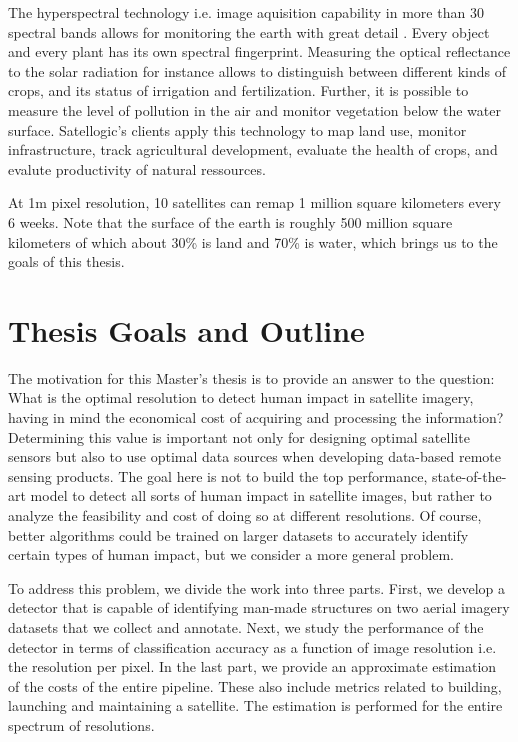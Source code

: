 The hyperspectral technology i.e. image aquisition capability in more than 30 spectral bands allows for monitoring the earth with great detail \parencite{satellogic2019}. Every object and every plant has its own spectral fingerprint. Measuring the optical reflectance to the solar radiation for instance allows to distinguish between different kinds of crops, and its status of irrigation and fertilization. Further, it is possible to measure the level of pollution in the air and monitor vegetation below the water surface. Satellogic's clients apply this technology to map land use, monitor infrastructure, track agricultural development, evaluate the health of crops, and evalute productivity of natural ressources.

At 1m pixel resolution, 10 satellites can remap 1 million square kilometers every 6 weeks. Note that the surface of the earth is roughly 500 million square kilometers of which about 30\% is land and 70\% is water, which brings us to the goals of this thesis.


\section{Thesis Goals and Outline}
The motivation for this Master's thesis is to provide an answer to the question: What is the optimal resolution to detect human impact in satellite imagery, having in mind the economical cost of acquiring and processing the information? 
Determining this value is important not only for designing optimal satellite sensors but also to use optimal data sources when developing data-based remote sensing products. The goal here is not to build the top performance, state-of-the-art model to detect all sorts of human impact in satellite images, but rather to analyze the feasibility and cost of doing so at different resolutions. Of course, better algorithms could be trained on larger datasets to accurately identify certain types of human impact, but we consider a more general problem.

To address this problem, we divide the work into three parts. First, we develop a detector that is capable of identifying man-made structures on two aerial imagery datasets that we collect and annotate. Next, we study the performance of the detector in terms of classification accuracy as a function of image resolution i.e. the resolution per pixel. In the last part, we provide an approximate estimation of the costs of the entire pipeline. These also include metrics related to building, launching and maintaining a satellite. The estimation is performed for the entire spectrum of resolutions.

